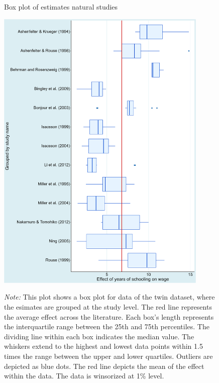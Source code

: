 \begin{figure}[!htbp]
  \begin{center}
    \caption{Box plot of estimates natural studies}
    \label{fig:box_plot_twins}
    \includegraphics[width=0.9\textwidth]{Figures/box_plot_study_name_twins.png}
  \end{center}\vspace{-0.7cm}
  \captionsetup{width=0.9\textwidth, font = scriptsize}
  \caption*{\emph{Note:} This plot shows a box plot for data of the twin dataset, where the esimates are grouped at the study level. The red line represents the average effect across the literature. Each box's length represents the interquartile range between the 25th and 75th percentiles. The dividing line within each box indicates the median value. The whiskers extend to the highest and lowest data points within 1.5 times the range between the upper and lower quartiles. Outliers are depicted as blue dots. The red line depicts the mean of the effect within the data. The data is winsorized at 1\% level.}
\end{figure}

